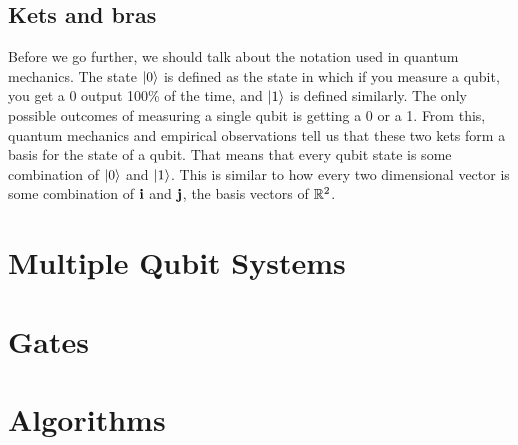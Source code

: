 \documentclass{textbook}
\begin{document}
\subsection{Kets and bras}
\label{sec:ketbra}
Before we go further, we should talk about the notation used in quantum mechanics. The state $\ket{0}$ is defined as the state in which if you measure a qubit, you get a 0 output 100\% of the time, and $\ket{1}$ is defined similarly. The only possible outcomes of measuring a single qubit is getting a 0 or a 1. From this, quantum mechanics and empirical observations tell us that these two kets form a basis for the state of a qubit. That means that every qubit state is some combination of $\ket{0}$ and $\ket{1}$. This is similar to how every two dimensional vector is some combination of $\mathbf{i}$ and $\mathbf{j}$, the basis vectors of $\mathbb{R}^2$. 

\section{Multiple Qubit Systems}

\section{Gates}

\section{Algorithms}
\end{document}
